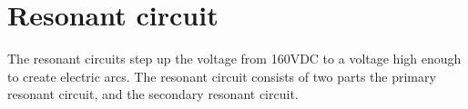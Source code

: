 
\section{Resonant circuit}

The resonant circuits step up the voltage from 160VDC to a voltage high enough to create electric arcs. The resonant circuit consists of two parts the primary resonant circuit, and the secondary resonant circuit.

